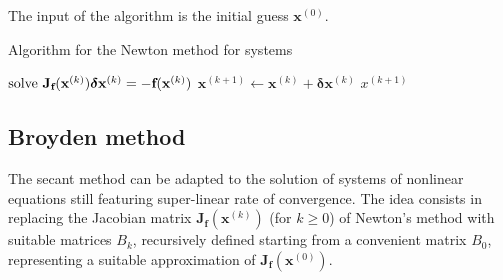 \documentclass[12pt, a4paper]{report}
\newtheorem[style=M,bodystyle=\normalfont]{theorem}{Theorem}
\newtheorem[style=M,bodystyle=\normalfont]{proposition}{Proposition}
\newtheorem[style=M,bodystyle=\normalfont]{corollary}{Corollary}
\newtheorem[style=M,bodystyle=\normalfont]{lemma}{Lemma}
\newtheorem[style=M,bodystyle=\normalfont]{definition}{Definition}
\begin{document}
    The input of the algorithm is the initial guess $\textbf{x}^{(0)}$. 
    \begin{algorithm}[H]
        \caption{Algorithm for the Newton method for systems}
            \begin{algorithmic}[1]
                    \State $\textnormal{solve  } \textbf{J}_{\textbf{f}}(\textbf{x}^{(k)})\boldsymbol{\delta}\textbf{x}^{(k)}=-\textbf{f}(\textbf{x}^{(k)})$
                    \State $\textbf{x}^{(k+1)} \leftarrow \textbf{x}^{(k)}+\boldsymbol{\delta}\textbf{x}^{(k)}$
                        \State \Return $x^{(k+1)}$
                    \EndIf
                \EndFor
            \end{algorithmic}
    \end{algorithm}

    \subsection{Broyden method}
    The secant method can be adapted to the solution of systems of nonlinear equations still featuring super-linear rate of convergence. The idea consists in replacing the Jacobian 
    matrix $\textbf{J}_{\textbf{f}}(\textbf{x}^{(k)})$ (for $k \geq 0$) of Newton's method with suitable matrices $B_k$, recursively defined starting from a convenient matrix $B_0$, 
    representing a suitable approximation of $\textbf{J}_{\textbf{f}}(\textbf{x}^{(0)})$.
    
\end{document}
